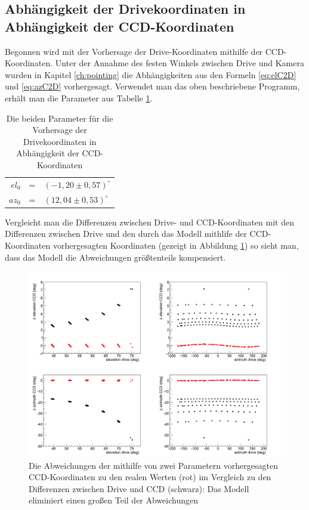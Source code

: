 \subsection{Abhängigkeit der Drivekoordinaten in Abhängigkeit der CCD-Koordinaten}
Begonnen wird mit der Vorhersage der Drive-Koordinaten mithilfe der CCD-Koordinaten. Unter der Annahme des festen Winkels zwischen Drive und Kamera wurden in Kapitel \ref{ch:pointing} die Abhängigkeiten aus den Formeln \ref{eq:elC2D} und \ref{eq:azC2D} vorhergesagt. Verwendet man das oben beschriebene Programm, erhält man die Parameter aus Tabelle \ref{tab:C2D}.
\begin{table}[htbp]
\centering
\begin{tabular}{rcl}
\toprule
$el_0$ &=& $(-1,20\pm0,57)^{\circ}$\\
$az_0$ &=& $(12,04\pm0,53)^{\circ}$\\
\bottomrule
\end{tabular}
\caption{Die beiden Parameter für die Vorhersage der Drivekoordinaten in Abhängigkeit der CCD-Koordinaten}
\label{tab:C2D}
\end{table}
Vergleicht man die Differenzen zwischen Drive- und CCD-Koordinaten mit den Differenzen zwischen Drive und den durch das Modell mithlife der CCD-Koordinaten vorhergesagten Koordinaten (gezeigt in Abbildung \ref{img:C2Dcomp}) so sieht man, dass das Modell die Abweichungen größtenteils kompensiert.%
\begin{figure}[htbp]
\centering
\includegraphics[width=\textwidth]{../341/C2Dcomp.png}
\caption{Die Abweichungen der mithilfe von zwei Parametern vorhergesagten CCD-Koordinaten zu den realen Werten (rot) im Vergleich zu den Differenzen zwischen Drive und CCD (schwarz): Das Modell eliminiert einen großen Teil der Abweichungen}
\label{img:C2Dcomp}
\end{figure}
